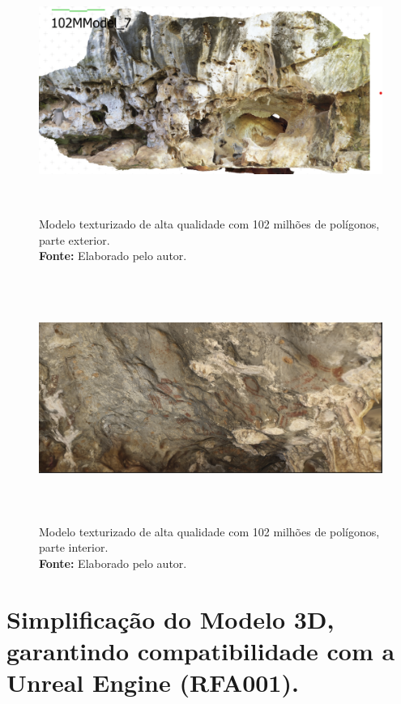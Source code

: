 \begin{enumerate}
\begin{figure}[H]
        \centering
        \includegraphics[height=8cm, keepaspectratio]{img/reality e fotogrametria processo/102M textura.png}
        \caption{Modelo texturizado de alta qualidade com 102 milhões de polígonos, parte exterior. \\
            \textbf{Fonte:} Elaborado pelo autor.}
        \label{fig:texturizado}
\end{figure}
\begin{figure}[H]
        \centering
        \includegraphics[height=8cm, keepaspectratio]{img/reality e fotogrametria processo/interior.png}
        \caption{Modelo texturizado de alta qualidade com 102 milhões de polígonos, parte interior. \\
            \textbf{Fonte:} Elaborado pelo autor.}
        \label{fig:interior}
\end{figure}
\end{enumerate}
    \section{Simplificação do Modelo 3D, garantindo compatibilidade com a Unreal Engine (RFA001).}
  
